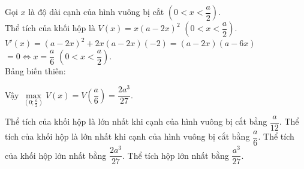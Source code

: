 \begin{ex}
{		Gọi $ x$ là độ dài cạnh của hình vuông bị cắt  $\left(0<x<\dfrac{a}{2}\right)$.\\
		Thể tích của khối hộp là $V(x)=x{\left(a-2x\right)^2}$ $\left(0<x<\dfrac{a}{2}\right).$\\ 
		$V'(x)=\left(a-2x\right)^2+2x\left(a-2x\right)\left(-2\right)=\left(a-2x\right)\left(a-6x\right)$  $=0\Leftrightarrow x=\dfrac{a}{6}$ $\left(0<x<\dfrac{a}{2}\right).$\\
		Bảng biến thiên: 
		\begin{center}
		\end{center}
		Vậy $\max\limits_{\left(0;\tfrac{a}{2}\right)}V(x)=V\left(\dfrac{a}{6}\right)=\dfrac{2a^3}{27}$. 
		\begin{itemchoice}
			\itemch Thể tích của  khối hộp là lớn nhất khi cạnh của hình vuông bị cắt bằng $\dfrac{a}{12}$.
			\itemch  Thể tích của khối hộp là lớn nhất khi cạnh của hình vuông bị cắt bằng $\dfrac{a}{6}$.
			\itemch Thể tích của khối hộp lớn nhất bằng $\dfrac{2a^3}{27}$. 
			\itemch Thể tích hộp lớn nhất  bằng $\dfrac{a^3}{27}$.
		\end{itemchoice}
	} 
\end{ex}

